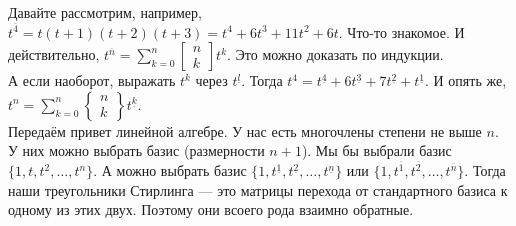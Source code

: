 \documentclass{article}
\begin{document}
\begin{itemize}
\begin{Comment}
            Давайте рассмотрим, например, $t^{\overline4}=t(t+1)(t+2)(t+3)=t^4+6t^3+11t^2+6t$. Что-то знакомое. И действительно, $t^{\overline n}=\sum\limits_{k=0}^n\left[\begin{matrix}n\\k\end{matrix}\right]t^k$. Это можно доказать по индукции.\\
            А если наоборот, выражать $t^k$ через $t^{\underline l}$. Тогда $t^4=t^{\underline4}+6t^{\underline3}+7t^{\underline2}+t^{\underline1}$. И опять же, $t^n=\sum\limits_{k=0}^n\left\{\begin{matrix}n\\k\end{matrix}\right\}t^{\underline k}$.\\
            Передаём привет линейной алгебре. У нас есть многочлены степени не выше $n$. У них можно выбрать базис (размерности $n+1$). Мы бы выбрали базис $\{1,t,t^2,\ldots,t^n\}$. А можно выбрать базис $\{1,t^{\underline 1},t^{\underline 2},\ldots,t^{\underline n}\}$ или $\{1,t^{\overline 1},t^{\overline 2},\ldots,t^{\overline n}\}$. Тогда наши треугольники Стирлинга --- это матрицы перехода от стандартного базиса к одному из этих двух. Поэтому они всоего рода взаимно обратные.
        \end{Comment}
    \end{itemize}
    \pagebreak
\end{document}
